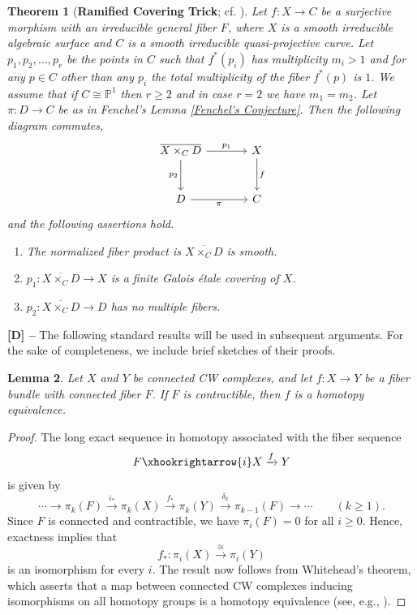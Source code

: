 \documentclass[12pt,reqno,twoside]{amsart}
\newtheorem{theorem}{Theorem}[section]
\newtheorem{lemma}[theorem]{Lemma}
\theoremstyle{definition}
\numberwithin{equation}{section}
\newcommand{\PP}{\mathbb{P}}
\begin{document}
\begin{theorem}[{{\bf Ramified Covering Trick}; cf. \cite[III, 3.2.1]{Miy2001}}]\label{Ramified covering trick}
	Let $f:X \to C$ be a surjective morphism with an irreducible general fiber $F$, where $X$ is a smooth irreducible algebraic surface and $C$ is a smooth irreducible quasi-projective curve. Let $p_1, p_2, \ldots, p_r$ be the points in $C$ such that $f^{\ast}(p_i)$ has multiplicity $m_i>1$ and for any $p\in C$ other than any $p_i$ the total multiplicity of the fiber $f^{\ast}(p)$ is $1$. We assume that if $C \cong \PP^1$ then $r\geq 2$ and in case $r=2$ we have $m_1=m_2$. Let $\pi: D \to C$ be as in Fenchel's Lemma \ref{Fenchel's Conjecture}. Then the following diagram commutes,
	$$
	\begin{tikzcd}[row sep=large, column sep=large]
	\overline{X \times_{C} D} \arrow[r, "p_1"] \arrow[d, "p_2"'] &X \arrow[d, "f"]\\
	D \arrow[r, "\pi"'] & C
	\end{tikzcd}
	$$ and the following assertions hold.
	\begin{enumerate}[\indent\rm(1)]
		\item The normalized fiber product  is $\overline{X \times_{C} D}$ is smooth.
		\item $p_1 : \overline{X \times_{C} D} \to X$ is a finite Galois {\'e}tale covering of $X$.
		\item $p_2 : \overline{X \times_{C} D} \to D$ has no multiple fibers.
	\end{enumerate}
\end{theorem}

\medskip

{\bf [D] --} The following standard results will be used in subsequent arguments. 
For the sake of completeness, we include brief sketches of their proofs.

\begin{lemma}\label{Lem: Homotopy equivalence if the fiber of a bundle is contractible}
Let $X$ and $Y$ be connected CW complexes, and let $f \colon X \to Y$ be a fiber bundle with connected fiber $F$. If $F$ is contractible, then $f$ is a homotopy equivalence.
\end{lemma}

\begin{proof}
The long exact sequence in homotopy associated with the fiber sequence 
\[
F \xhookrightarrow{i} X \xrightarrow{f} Y
\]
is given by
\[
\cdots \to \pi_k(F) \xrightarrow{i_\ast} \pi_k(X) \xrightarrow{f_\ast} \pi_k(Y) \xrightarrow{\delta_k} \pi_{k-1}(F) \to \cdots \qquad (k \ge 1).
\]
Since $F$ is connected and contractible, we have $\pi_i(F) = 0$ for all $i \ge 0$. Hence, exactness implies that 
\[
f_\ast \colon \pi_i(X) \xrightarrow{\ \cong\ } \pi_i(Y)
\]
is an isomorphism for every $i$. The result now follows from Whitehead’s theorem, which asserts that a map between connected CW complexes inducing isomorphisms on all homotopy groups is a homotopy equivalence (see, e.g., \cite[Theorem~4.5]{Whi1949b}).
\end{proof}
\end{document}
